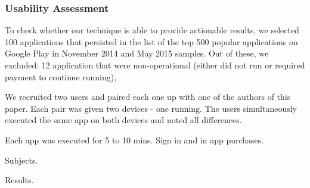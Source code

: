 \subsubsection{Usability Assessment}
To check whether our technique is able to provide actionable results, we selected 100 applications that persisted in the list of the top 500 popular applications on Google Play in November 2014 and May 2015 samples. Out of these, we excluded: 12 application that were non-operational (either did not run or required payment to continue running), 


We recruited two users and paired each one up with one of the authors of this paper.  Each pair was given two devices - one running. 
The users simultaneously executed the same app on both devices and noted all differences.

Each app was executed for 5 to 10 mins. Sign in and in app purchases.

Subjects.

Results.





